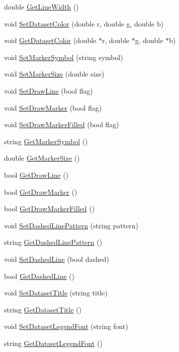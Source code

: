 \begin{DoxyCompactItemize}
\item 
double \hyperlink{class_c_data_set_a702afa8994f13497d32e6250a2abc6b1}{Get\-Line\-Width} ()
\item 
void \hyperlink{class_c_data_set_aa2ecb8a1eff02013f6c35f17b2701e11}{Set\-Dataset\-Color} (double r, double g, double b)
\item 
void \hyperlink{class_c_data_set_aa5d4d9b5e450a0452d8b589b97924120}{Get\-Dataset\-Color} (double $\ast$r, double $\ast$g, double $\ast$b)
\item 
void \hyperlink{class_c_data_set_a52f7568f9bfaf6deb114defa22e56f0d}{Set\-Marker\-Symbol} (string symbol)
\item 
void \hyperlink{class_c_data_set_a577265c01d642c1c32bd1a9eb3e160f5}{Set\-Marker\-Size} (double size)
\item 
void \hyperlink{class_c_data_set_aee28ea618c63719e5394f80bf4e83e6f}{Set\-Draw\-Line} (bool flag)
\item 
void \hyperlink{class_c_data_set_a2849f54c1d0d1357e9abcc3ce949f274}{Set\-Draw\-Marker} (bool flag)
\item 
void \hyperlink{class_c_data_set_a038303f1738fe602ef8d02bc8a3a2e11}{Set\-Draw\-Marker\-Filled} (bool flag)
\item 
string \hyperlink{class_c_data_set_aa7c2e91cea0d810fc307e8211ba627ba}{Get\-Marker\-Symbol} ()
\item 
double \hyperlink{class_c_data_set_ad78ad01bec5f0bf89b24d47376a360ba}{Get\-Marker\-Size} ()
\item 
bool \hyperlink{class_c_data_set_a6a513b5667a3048ba6f4194e8f4840ca}{Get\-Draw\-Line} ()
\item 
bool \hyperlink{class_c_data_set_ada05c016612e016efd55e989bfc94863}{Get\-Draw\-Marker} ()
\item 
bool \hyperlink{class_c_data_set_ae6037445814643d8500e302e2459642f}{Get\-Draw\-Marker\-Filled} ()
\item 
void \hyperlink{class_c_data_set_adf28bcb197a86830c3eff841d4b4dfe7}{Set\-Dashed\-Line\-Pattern} (string pattern)
\item 
string \hyperlink{class_c_data_set_a3f32df0b56dcf81a52f2485432fa3841}{Get\-Dashed\-Line\-Pattern} ()
\item 
void \hyperlink{class_c_data_set_a99e6ec00a4c48080bd987fcd4a68cdf3}{Set\-Dashed\-Line} (bool dashed)
\item 
bool \hyperlink{class_c_data_set_afc4a305f6f38c1a42185c2670b9e9c90}{Get\-Dashed\-Line} ()
\item 
void \hyperlink{class_c_data_set_afab80dbc02d9940bb01ff91d6b267585}{Set\-Dataset\-Title} (string title)
\item 
string \hyperlink{class_c_data_set_a01c8f6b32c8c28b151f990e1a207c238}{Get\-Dataset\-Title} ()
\item 
void \hyperlink{class_c_data_set_ad8cb0aad4fe21ee89178234cdb0b995f}{Set\-Dataset\-Legend\-Font} (string font)
\item 
string \hyperlink{class_c_data_set_a07320c57652fc2f3e7e2f4898df86f2e}{Get\-Dataset\-Legend\-Font} ()
\end{DoxyCompactItemize}
